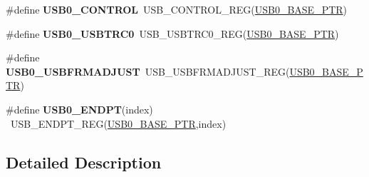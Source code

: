 \begin{DoxyCompactItemize}
\item 
\hypertarget{group___u_s_b___register___accessor___macros_gaf00c1bd9c15954db30472d3273cf7ec2}{}\#define {\bfseries U\+S\+B0\+\_\+\+C\+O\+N\+T\+R\+O\+L}~U\+S\+B\+\_\+\+C\+O\+N\+T\+R\+O\+L\+\_\+\+R\+E\+G(\hyperlink{group___u_s_b___peripheral_ga598ff5eb20a0551af232710b3f27640a}{U\+S\+B0\+\_\+\+B\+A\+S\+E\+\_\+\+P\+T\+R})\label{group___u_s_b___register___accessor___macros_gaf00c1bd9c15954db30472d3273cf7ec2}

\item 
\hypertarget{group___u_s_b___register___accessor___macros_ga05ec0dc133dcc7675dda9e96c6ed222b}{}\#define {\bfseries U\+S\+B0\+\_\+\+U\+S\+B\+T\+R\+C0}~U\+S\+B\+\_\+\+U\+S\+B\+T\+R\+C0\+\_\+\+R\+E\+G(\hyperlink{group___u_s_b___peripheral_ga598ff5eb20a0551af232710b3f27640a}{U\+S\+B0\+\_\+\+B\+A\+S\+E\+\_\+\+P\+T\+R})\label{group___u_s_b___register___accessor___macros_ga05ec0dc133dcc7675dda9e96c6ed222b}

\item 
\hypertarget{group___u_s_b___register___accessor___macros_ga7b5628cccd04a47b3f3bc51d01b7fc2d}{}\#define {\bfseries U\+S\+B0\+\_\+\+U\+S\+B\+F\+R\+M\+A\+D\+J\+U\+S\+T}~U\+S\+B\+\_\+\+U\+S\+B\+F\+R\+M\+A\+D\+J\+U\+S\+T\+\_\+\+R\+E\+G(\hyperlink{group___u_s_b___peripheral_ga598ff5eb20a0551af232710b3f27640a}{U\+S\+B0\+\_\+\+B\+A\+S\+E\+\_\+\+P\+T\+R})\label{group___u_s_b___register___accessor___macros_ga7b5628cccd04a47b3f3bc51d01b7fc2d}

\item 
\hypertarget{group___u_s_b___register___accessor___macros_gab618a89bd493abe85e2d995d914a0706}{}\#define {\bfseries U\+S\+B0\+\_\+\+E\+N\+D\+P\+T}(index)                                            ~U\+S\+B\+\_\+\+E\+N\+D\+P\+T\+\_\+\+R\+E\+G(\hyperlink{group___u_s_b___peripheral_ga598ff5eb20a0551af232710b3f27640a}{U\+S\+B0\+\_\+\+B\+A\+S\+E\+\_\+\+P\+T\+R},index)\label{group___u_s_b___register___accessor___macros_gab618a89bd493abe85e2d995d914a0706}

\end{DoxyCompactItemize}


\subsection{Detailed Description}
